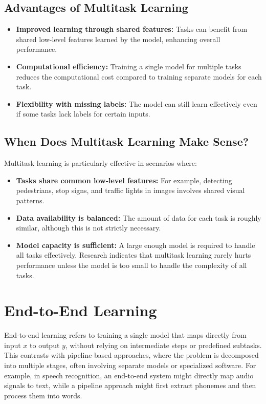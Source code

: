 \documentclass[12pt,openany]{book}
\begin{document}
\subsection{Advantages of Multitask Learning}

\begin{itemize}
    \item \textbf{Improved learning through shared features:} Tasks can benefit from shared low-level features learned by the model, enhancing overall performance.
    \item \textbf{Computational efficiency:} Training a single model for multiple tasks reduces the computational cost compared to training separate models for each task.
    \item \textbf{Flexibility with missing labels:} The model can still learn effectively even if some tasks lack labels for certain inputs.
\end{itemize}


\subsection{When Does Multitask Learning Make Sense?}

Multitask learning is particularly effective in scenarios where:
\begin{itemize}
    \item \textbf{Tasks share common low-level features:} For example, detecting pedestrians, stop signs, and traffic lights in images involves shared visual patterns.
    \item \textbf{Data availability is balanced:} The amount of data for each task is roughly similar, although this is not strictly necessary.
    \item \textbf{Model capacity is sufficient:} A large enough model is required to handle all tasks effectively. Research indicates that multitask learning rarely hurts performance unless the model is too small to handle the complexity of all tasks.
\end{itemize}



\section{End-to-End Learning}

End-to-end learning refers to training a single model that maps directly from input \(x\) to output \(y\), without relying on intermediate steps or predefined subtasks. This contrasts with pipeline-based approaches, where the problem is decomposed into multiple stages, often involving separate models or specialized software. For example, in speech recognition, an end-to-end system might directly map audio signals to text, while a pipeline approach might first extract phonemes and then process them into words.
\end{document}
